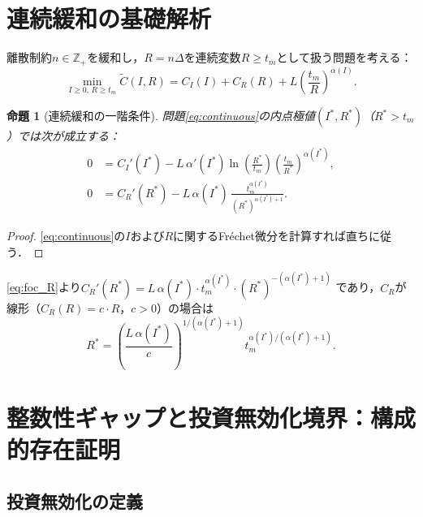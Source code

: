 \documentclass[12pt,a4paper]{article}
\theoremstyle{plain}
\newtheorem{proposition}[theorem]{命題}
\theoremstyle{definition}
\theoremstyle{remark}
\newcommand{\Z}{\mathbb{Z}}
\begin{document}
\section{連続緩和の基礎解析}
\label{sec:continuous}

離散制約$n \in \Z_+$を緩和し，$R = n\Delta$を連続変数$R \ge t_m$として扱う問題を考える：
\begin{equation}\label{eq:continuous}
  \min_{I \ge 0,\, R \ge t_m} \tilde{C}(I,R)
    = C_I(I) + C_R(R) + L\left(\frac{t_m}{R}\right)^{\alpha(I)}.
\end{equation}

\begin{proposition}[連続緩和の一階条件]\label{prop:foc}
問題\eqref{eq:continuous}の内点極値$(I^*, R^*)$（$R^* > t_m$）では次が成立する：
\begin{align}
  0 &= C_I'(I^*) - L\,\alpha'(I^*)\ln\!\left(\frac{R^*}{t_m}\right)
       \left(\frac{t_m}{R^*}\right)^{\alpha(I^*)},\label{eq:foc_I}\\
  0 &= C_R'(R^*) - L\,\alpha(I^*)\,\frac{t_m^{\alpha(I^*)}}{(R^*)^{\alpha(I^*)+1}}.\label{eq:foc_R}
\end{align}
\end{proposition}

\begin{proof}
\eqref{eq:continuous}の$I$および$R$に関するFr\'{e}chet微分を計算すれば直ちに従う．
\end{proof}

\eqref{eq:foc_R}より$C_R'(R^*) = L\,\alpha(I^*)\cdot t_m^{\alpha(I^*)}\cdot (R^*)^{-(\alpha(I^*)+1)}$
であり，$C_R$が線形（$C_R(R) = c\cdot R$，$c>0$）の場合は
\begin{equation}\label{eq:Rstar_explicit}
  R^* = \left(\frac{L\,\alpha(I^*)}{c}\right)^{1/(\alpha(I^*)+1)} t_m^{\alpha(I^*)/(\alpha(I^*)+1)}.
\end{equation}

\section{整数性ギャップと投資無効化境界：構成的存在証明}
\label{sec:gap}

\subsection{投資無効化の定義}
\end{document}
